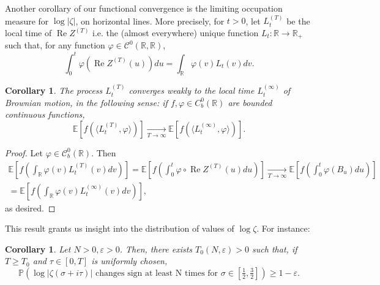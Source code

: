 \documentclass{article}
\newcommand{\phe}{\varphi}
\newcommand{\Proba}{\mathbb{P}}
\DeclareMathOperator{\Rea}{Re}
\newcommand{\1}{\mathds{1}}
\numberwithin{equation}{section}
\newcommand{\eps}{\varepsilon}
\renewcommand{\geq}{\geqslant}
\newcommand{\E}{\mathbb{E}}
\newcommand{\R}{\mathbb{R}}
\theoremstyle{plain} %
\newtheorem{corollary}[theorem]{Corollary}
\begin{document}
Another corollary of our functional convergence is the limiting occupation measure for $\log |\zeta|$, on horizontal lines. More precisely, 
 for $t > 0$, let $L^{(T)}_t$ be the local time of $\Rea Z^{(T)}$ i.e. the (almost everywhere) unique function $L_t : \R \rightarrow \R_+$ such that, for any function $\phe \in \mathcal{C}^0(\R, \R)$,
    \begin{equation}
        \int_{0}^t \phe(\Rea Z^{(T)}(u)) du = \int_{\R} \phe(v) L_t(v) dv.
    \end{equation}

\begin{corollary}
\label{localtime}
The process $L^{(T)}_t$ converges weakly to the local time $L^{(\infty)}_t$ of Brownian motion, in the following sense: if $f, \phe \in C_b^0(\R)$ are bounded continuous functions,
    \begin{equation}
        \E[f(\langle L_t^{(T)}, \phe \rangle)] \underset{T \to \infty}{\longrightarrow} \E[f(\langle L_t^{(\infty)}, \phe \rangle)].
    \end{equation}
\end{corollary}

\begin{proof}

    Let $\phe \in \mathcal{C}^0_b(\R)$. Then
\begin{multline*}
        \E \left[ f \left(\int_{\R} \phe(v) L_t^{(T)}(v) dv \right) \right] = \E \left[f \left(  \int_0^t \phe \circ \Rea Z^{(T)} (u) du \right)\right] 
         \underset{T \to \infty}{\longrightarrow} \E \left[ f \left( \int_0^t \phe (B_u)du \right) \right]\\
         = \E \left[ f \left( \int_{\R} \phe(v) L^{(\infty)}_t(v) dv \right) \right],
\end{multline*}
as desired.
\end{proof}

This result grants us insight into the distribution of values of $\log \zeta$. For instance:

\begin{corollary}
    Let $N > 0, \eps > 0$. Then, there exists $T_0(N, \eps) > 0$ such that, if $T \geq T_0$ and $\tau \in [0, T]$ is uniformly chosen, 
    \begin{equation}
        \Proba(\log |\zeta( \sigma + i\tau)| \text{ changes sign at least N times for } \sigma \in [\tfrac{1}{2},\tfrac{3}{2}]) \geq 1 - \eps.
    \end{equation}
\end{corollary}
\end{document}
